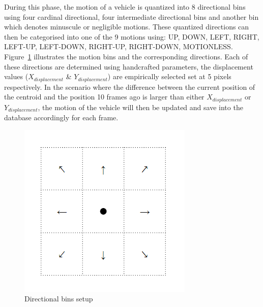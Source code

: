 During this phase, the motion of a vehicle is quantized into 8 directional bins using four cardinal directional, four intermediate directional bins and another bin which denotes minuscule or negligible motions.
These quantized directions can then be categorised into one of the 9 motions using: UP, DOWN, LEFT, RIGHT, LEFT-UP, LEFT-DOWN, RIGHT-UP, RIGHT-DOWN, MOTIONLESS.
Figure~\ref{fig:cardinalbins} illustrates the motion bins and the corresponding directions.
Each of these directions are determined using handcrafted parameters, the displacement values ($X_{displacement}$ \& $Y_{displacement}$) are empirically selected set at 5 pixels respectively.
In the scenario where the difference between the current position of the centroid and the position 10 frames ago is larger than either $X_{displacement}$ or $Y_{displacement}$, the motion of the vehicle will then be updated and save into the database accordingly for each frame.

\begin{figure}[H]\centering
\includegraphics[width=.5\textwidth]{image/new/motion.PNG}
\caption{Directional bins setup}
\label{fig:cardinalbins}
\end{figure}


